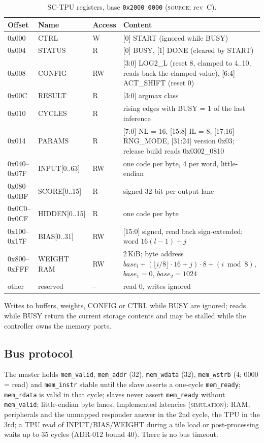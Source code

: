 \documentclass[10pt,a4paper]{article}
\newcommand{\lbl}[1]{\textsc{#1}}          %
\begin{document}
\begin{table}[htbp]
\centering\small
\caption{SC-TPU registers, base \texttt{0x2000\_0000} (\lbl{source}; rev~C).}\label{tab:tpuregs}
\begin{tabularx}{\linewidth}{@{}lllL@{}}
\toprule
Offset & Name & Access & Content\\
\midrule
0x000 & CTRL & W & [0] START (ignored while BUSY)\\
0x004 & STATUS & R & [0] BUSY, [1] DONE (cleared by START)\\
0x008 & CONFIG & RW & [3:0] LOG2\_L (reset 8, clamped to 4..10, reads back the clamped value), [6:4] ACT\_SHIFT (reset 0)\\
0x00C & RESULT & R & [3:0] argmax class\\
0x010 & CYCLES & R & rising edges with BUSY = 1 of the last inference\\
0x014 & PARAMS & R & [7:0] NL = 16, [15:8] IL = 8, [17:16] RNG\_MODE, [31:24] version 0x03; release build reads 0x0302\_0810\\
0x040--0x07F & INPUT[0..63] & RW & one code per byte, 4 per word, little-endian\\
0x080--0x0BF & SCORE[0..15] & R & signed 32-bit per output lane\\
0x0C0--0x0CF & HIDDEN[0..15] & R & one code per byte\\
0x100--0x17F & BIAS[0..31] & RW & [15:0] signed, read back sign-extended; word $16(l-1)+j$\\
0x800--0xFFF & WEIGHT RAM & RW & 2\,KiB; byte address $\mathit{base}_l+(\lfloor i/8\rfloor\cdot16+j)\cdot8+(i \bmod 8)$, $\mathit{base}_1=0$, $\mathit{base}_2=1024$\\
other & reserved & -- & read 0, writes ignored\\
\bottomrule
\end{tabularx}
\end{table}
Writes to buffers, weights, CONFIG or CTRL while BUSY are ignored; reads
while BUSY return the current storage contents and may be stalled while the
controller owns the memory ports.

\subsection{Bus protocol}
The master holds \texttt{mem\_valid}, \texttt{mem\_addr} (32), \texttt{mem\_wdata}
(32), \texttt{mem\_wstrb} (4; 0000 = read) and \texttt{mem\_instr} stable until
the slave asserts a one-cycle \texttt{mem\_ready}; \texttt{mem\_rdata} is valid in
that cycle; slaves never assert \texttt{mem\_ready} without \texttt{mem\_valid};
little-endian byte lanes. Implemented latencies (\lbl{simulation}): RAM,
peripherals and the unmapped responder answer in the 2nd cycle, the TPU in the
3rd; a TPU read of INPUT/BIAS/WEIGHT during a tile load or post-processing
waits up to 35 cycles (ADR-012 bound 40). There is no bus timeout.
\end{document}
